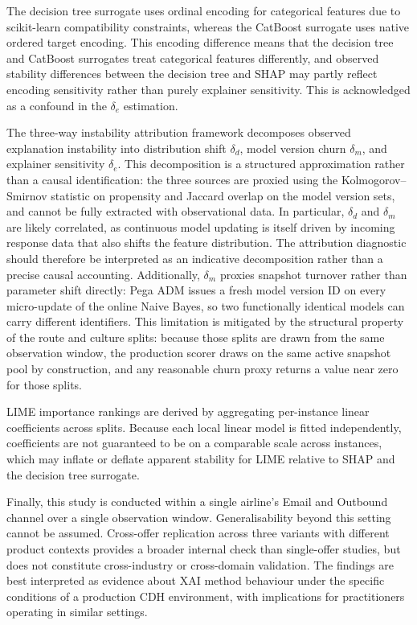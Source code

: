 \documentclass[oneside]{memoir} %
\begin{document}
The decision tree surrogate uses ordinal encoding for categorical features due to scikit-learn compatibility constraints, whereas the CatBoost surrogate uses native ordered target encoding. This encoding difference means that the decision tree and CatBoost surrogates treat categorical features differently, and observed stability differences between the decision tree and SHAP may partly reflect encoding sensitivity rather than purely explainer sensitivity. This is acknowledged as a confound in the $\delta_e$ estimation.

The three-way instability attribution framework decomposes observed explanation instability into distribution shift $\delta_d$, model version churn $\delta_m$, and explainer sensitivity $\delta_e$. This decomposition is a structured approximation rather than a causal identification: the three sources are proxied using the Kolmogorov--Smirnov statistic on propensity and Jaccard overlap on the model version sets, and cannot be fully extracted with observational data. In particular, $\delta_d$ and $\delta_m$ are likely correlated, as continuous model updating is itself driven by incoming response data that also shifts the feature distribution. The attribution diagnostic should therefore be interpreted as an indicative decomposition rather than a precise causal accounting. Additionally, $\delta_m$ proxies snapshot turnover rather than parameter shift directly: Pega ADM issues a fresh model version ID on every micro-update of the online Naive Bayes, so two functionally identical models can carry different identifiers. This limitation is mitigated by the structural property of the route and culture splits: because those splits are drawn from the same observation window, the production scorer draws on the same active snapshot pool by construction, and any reasonable churn proxy returns a value near zero for those splits.

LIME importance rankings are derived by aggregating per-instance linear coefficients across splits. Because each local linear model is fitted independently, coefficients are not guaranteed to be on a comparable scale across instances, which may inflate or deflate apparent stability for LIME relative to SHAP and the decision tree surrogate.

Finally, this study is conducted within a single airline's Email and Outbound channel over a single observation window. Generalisability beyond this setting cannot be assumed. Cross-offer replication across three variants with different product contexts provides a broader internal check than single-offer studies, but does not constitute cross-industry or cross-domain validation. The findings are best interpreted as evidence about XAI method behaviour under the specific conditions of a production CDH environment, with implications for practitioners operating in similar settings.
\end{document}
